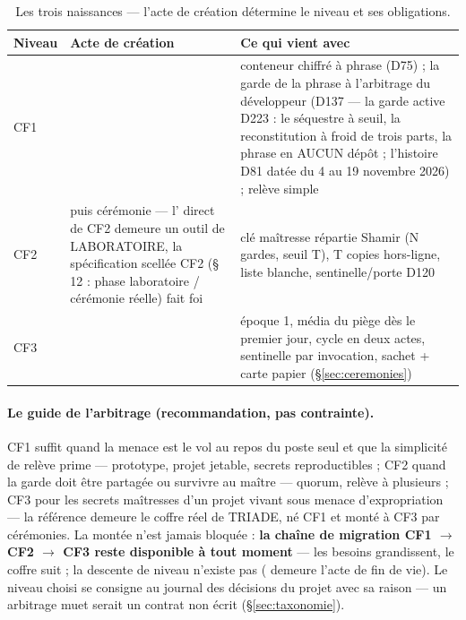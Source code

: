 \begin{table}[htbp]
\centering\small
\caption{Les trois naissances — l'acte de création détermine le niveau et ses obligations.}
\label{tab:naissances}
\begin{tabularx}{\textwidth}{@{}l >{\raggedright\arraybackslash}p{4.6cm} Y@{}}
\toprule
\textbf{Niveau} & \textbf{Acte de création} & \textbf{Ce qui vient avec} \\
\midrule
CF1 &  & conteneur chiffré à phrase (D75) ; la garde
de la phrase à l'arbitrage du développeur (D137 — la garde active
D223 : le séquestre à seuil, la reconstitution à froid de trois
parts, la phrase en AUCUN dépôt ; l'histoire D81 datée du 4 au
19 novembre 2026) ; relève simple \\
CF2 &  puis cérémonie  —
l' direct de CF2 demeure un outil de LABORATOIRE, la spécification
scellée CF2 (§ 12 : phase laboratoire / cérémonie réelle) fait foi & clé maîtresse
répartie Shamir (N gardes, seuil T), T copies hors-ligne, liste blanche,
sentinelle/porte D120 \\
CF3 &  & époque 1, média du piège dès le premier jour,
cycle en deux actes, sentinelle par invocation, sachet + carte papier
(§\ref{sec:ceremonies}) \\
\bottomrule
\end{tabularx}
\end{table}

\paragraph{Le guide de l'arbitrage (recommandation, pas contrainte).} CF1 suffit
quand la menace est le vol au repos du poste seul et que la simplicité de relève
prime — prototype, projet jetable, secrets reproductibles ; CF2 quand la garde doit
être partagée ou survivre au maître — quorum, relève à plusieurs ; CF3 pour les
secrets maîtresses d'un projet vivant sous menace d'expropriation — la référence
demeure le coffre réel de TRIADE, né CF1 et monté à CF3 par cérémonies. La montée
n'est jamais bloquée : \textbf{la chaîne de migration CF1 $\to$ CF2 $\to$ CF3 reste
disponible à tout moment} — les besoins grandissent, le coffre suit ; la descente de
niveau n'existe pas ( demeure l'acte de fin de vie). Le niveau choisi se
consigne au journal des décisions du projet avec sa raison — un arbitrage muet serait
un contrat non écrit (§\ref{sec:taxonomie}).

